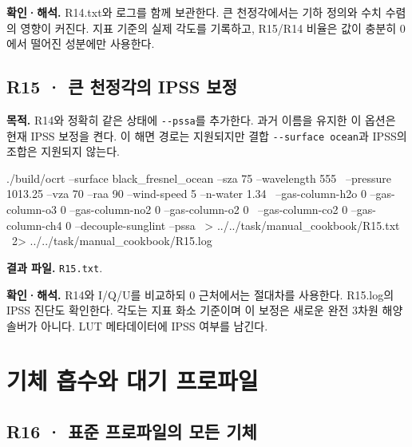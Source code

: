 \textbf{확인·해석. }R14.txt와 로그를 함께 보관한다. 큰 천정각에서는 기하 정의와 수치 수렴의 영향이 커진다. 지표 기준의 실제 각도를 기록하고, R15/R14 비율은 값이 충분히 0에서 떨어진 성분에만 사용한다.


\subsection{R15 · 큰 천정각의 IPSS 보정}
\label{sec:auto:09_cookbook:3.9}

\label{recipe:R15}

\textbf{목적. }R14와 정확히 같은 상태에 \texttt{-\allowbreak{}-\allowbreak{}pssa}를 추가한다. 과거 이름을 유지한 이 옵션은 현재 IPSS 보정을 켠다. 이 해면 경로는 지원되지만 결합 \texttt{-\allowbreak{}-\allowbreak{}surface ocean}과 IPSS의 조합은 지원되지 않는다.

\noindent\begin{minipage}{\linewidth}
\begin{ManualCode}

./build/ocrt --surface black_fresnel_ocean --sza 75 --wavelength 555 \
  --pressure 1013.25 --vza 70 --raa 90 --wind-speed 5 --n-water 1.34 \
  --gas-column-h2o 0 --gas-column-o3 0 --gas-column-no2 0 --gas-column-o2 0 \
  --gas-column-co2 0 --gas-column-ch4 0 --decouple-sunglint --pssa \
  > ../../task/manual_cookbook/R15.txt \
  2> ../../task/manual_cookbook/R15.log

\end{ManualCode}
\end{minipage}\par

\textbf{결과 파일. }\texttt{R15.txt}.

\textbf{확인·해석. }R14와 I/Q/U를 비교하되 0 근처에서는 절대차를 사용한다. R15.log의 IPSS 진단도 확인한다. 각도는 지표 화소 기준이며 이 보정은 새로운 완전 3차원 해양 솔버가 아니다. LUT 메타데이터에 IPSS 여부를 남긴다.

\section{기체 흡수와 대기 프로파일}
\label{sec:auto:09_cookbook:4}


\subsection{R16 · 표준 프로파일의 모든 기체}
\label{sec:auto:09_cookbook:4.1}

